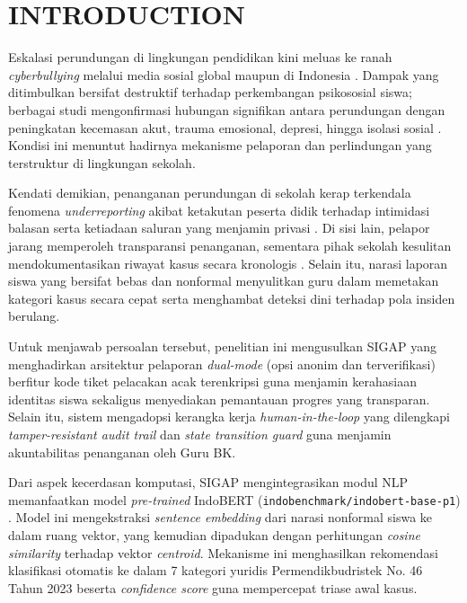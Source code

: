 \documentclass[conference]{IEEEtran}
\begin{document}
\section{INTRODUCTION}

Eskalasi perundungan di lingkungan pendidikan kini meluas ke ranah \textit{cyberbullying} melalui media sosial global \cite{zhang2022} maupun di Indonesia \cite{kaloeti2021}. Dampak yang ditimbulkan bersifat destruktif terhadap perkembangan psikososial siswa; berbagai studi mengonfirmasi hubungan signifikan antara perundungan dengan peningkatan kecemasan akut, trauma emosional, depresi, hingga isolasi sosial \cite{fabris2024}. Kondisi ini menuntut hadirnya mekanisme pelaporan dan perlindungan yang terstruktur di lingkungan sekolah.

Kendati demikian, penanganan perundungan di sekolah kerap terkendala fenomena \textit{underreporting} akibat ketakutan peserta didik terhadap intimidasi balasan serta ketiadaan saluran yang menjamin privasi \cite{wachs2022,lee2024}. Di sisi lain, pelapor jarang memperoleh transparansi penanganan, sementara pihak sekolah kesulitan mendokumentasikan riwayat kasus secara kronologis \cite{evangelio2022,kasturiratna2025}. Selain itu, narasi laporan siswa yang bersifat bebas dan nonformal menyulitkan guru dalam memetakan kategori kasus secara cepat serta menghambat deteksi dini terhadap pola insiden berulang.

Untuk menjawab persoalan tersebut, penelitian ini mengusulkan SIGAP yang menghadirkan arsitektur pelaporan \textit{dual-mode} (opsi anonim dan terverifikasi) berfitur kode tiket pelacakan acak terenkripsi guna menjamin kerahasiaan identitas siswa sekaligus menyediakan pemantauan progres yang transparan. Selain itu, sistem mengadopsi kerangka kerja \textit{human-in-the-loop} yang dilengkapi \textit{tamper-resistant audit trail} dan \textit{state transition guard} guna menjamin akuntabilitas penanganan oleh Guru BK.

Dari aspek kecerdasan komputasi, SIGAP mengintegrasikan modul NLP memanfaatkan model \textit{pre-trained} IndoBERT (\texttt{indobenchmark/indobert-base-p1}) \cite{wilie2020}. Model ini mengekstraksi \textit{sentence embedding} dari narasi nonformal siswa ke dalam ruang vektor, yang kemudian dipadukan dengan perhitungan \textit{cosine similarity} terhadap vektor \textit{centroid}. Mekanisme ini menghasilkan rekomendasi klasifikasi otomatis ke dalam 7 kategori yuridis Permendikbudristek No. 46 Tahun 2023 beserta \textit{confidence score} guna mempercepat triase awal kasus.
\end{document}

